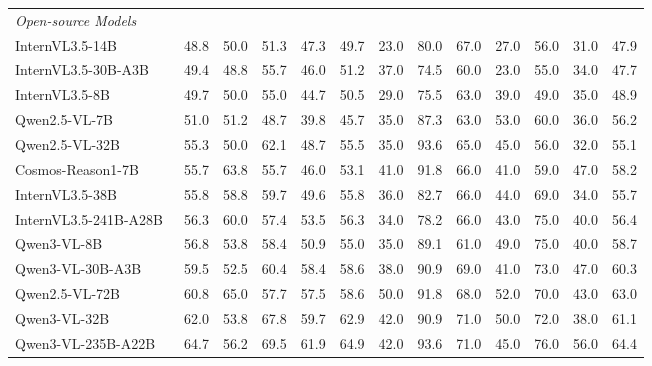 \begin{table}[t]
{\begin{tabular}{@{}l|c|cccc|*{7}{c}@{}}
\midrule
\multicolumn{13}{l}{\cellcolor{gray!10}\textit{Open-source Models}} \\
  \; InternVL3.5-14B~\cite{wang2025internvl3_5} & 48.8 & 50.0 & 51.3 & 47.3 & 49.7 & 23.0 & 80.0 & 67.0 & 27.0 & 56.0 & 31.0 & 47.9 \\
  \; InternVL3.5-30B-A3B~\cite{wang2025internvl3_5} & 49.4 & 48.8 & 55.7 & 46.0 & 51.2 & 37.0 & 74.5 & 60.0 & 23.0 & 55.0 & 34.0 & 47.7 \\
  \; InternVL3.5-8B~\cite{wang2025internvl3_5} & 49.7 & 50.0 & 55.0 & 44.7 & 50.5 & 29.0 & 75.5 & 63.0 & 39.0 & 49.0 & 35.0 & 48.9 \\
  \; Qwen2.5-VL-7B~\cite{bai2025qwen25vltechnicalreport} & 51.0 & 51.2 & 48.7 & 39.8 & 45.7 & 35.0 & 87.3 & 63.0 & \cellcolor{lightred!40}53.0 & 60.0 & 36.0 & 56.2 \\
  \; Qwen2.5-VL-32B~\cite{bai2025qwen25vltechnicalreport} & 55.3 & 50.0 & 62.1 & 48.7 & 55.5 & 35.0 & \cellcolor{lightred!40}93.6 & 65.0 & 45.0 & 56.0 & 32.0 & 55.1 \\
  \; Cosmos-Reason1-7B~\cite{reason1} & 55.7 & 63.8 & 55.7 & 46.0 & 53.1 & 41.0 & 91.8 & 66.0 & 41.0 & 59.0 & 47.0 & 58.2 \\
  \; InternVL3.5-38B~\cite{wang2025internvl3_5} & 55.8 & 58.8 & 59.7 & 49.6 & 55.8 & 36.0 & 82.7 & 66.0 & 44.0 & 69.0 & 34.0 & 55.7 \\
  \; InternVL3.5-241B-A28B~\cite{wang2025internvl3_5} & 56.3 & 60.0 & 57.4 & 53.5 & 56.3 & 34.0 & 78.2 & 66.0 & 43.0 & 75.0 & 40.0 & 56.4 \\
  \; Qwen3-VL-8B~\cite{qwen_vl_3} & 56.8 & 53.8 & 58.4 & 50.9 & 55.0 & 35.0 & 89.1 & 61.0 & 49.0 & 75.0 & 40.0 & 58.7 \\
  \; Qwen3-VL-30B-A3B~\cite{qwen_vl_3} & 59.5 & 52.5 & 60.4 & 58.4 & 58.6 & 38.0 & 90.9 & 69.0 & 41.0 & 73.0 & 47.0 & 60.3 \\
  \; Qwen2.5-VL-72B~\cite{bai2025qwen25vltechnicalreport} & 60.8 & \cellcolor{lightred!40}65.0 & 57.7 & 57.5 & 58.6 & \cellcolor{lightred!40}50.0 & 91.8 & 68.0 & 52.0 & 70.0 & 43.0 & 63.0 \\
  \; Qwen3-VL-32B~\cite{qwen_vl_3} & 62.0 & 53.8 & 67.8 & 59.7 & 62.9 & 42.0 & 90.9 & \cellcolor{lightred!40}71.0 & 50.0 & 72.0 & 38.0 & 61.1 \\
  \; Qwen3-VL-235B-A22B~\cite{qwen_vl_3} & \cellcolor{lightred!40}64.7 & 56.2 & \cellcolor{lightred!40}69.5 & \cellcolor{lightred!40}61.9 & \cellcolor{lightred!40}64.9 & 42.0 & \cellcolor{lightred!40}93.6 & \cellcolor{lightred!40}71.0 & 45.0 & \cellcolor{lightred!40}76.0 & \cellcolor{lightred!40}56.0 & \cellcolor{lightred!40}64.4 \\
\bottomrule
\end{tabular}%
}
\vspace{-6pt}
\label{tab:reason_results}
\end{table}

